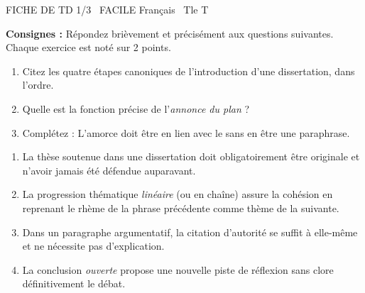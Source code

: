 \documentclass[11pt]{article}
\begin{document}
\begin{tcolorbox}[enhanced,colback=popink,colframe=popink,arc=10pt,boxrule=0pt,left=12pt,right=12pt,top=9pt,bottom=9pt]
{\color{white}\popxbold\small FICHE DE TD 1/3 \textbullet\ FACILE \hfill Français \textbullet\ Tle T\par}
\end{tcolorbox}
\vspace{4pt}
\textbf{Consignes :} Répondez brièvement et précisément aux questions suivantes. Chaque exercice est noté sur 2 points.

\begin{exercice}
\begin{enumerate}
    \item Citez les quatre étapes canoniques de l'introduction d'une dissertation, dans l'ordre.
    \item Quelle est la fonction précise de l'\textit{annonce du plan} ?
    \item Complétez : L'amorce doit être en lien avec le \underline{\hspace{3cm}} sans en être une paraphrase.
\end{enumerate}
\end{exercice}

\begin{exercice}
\begin{enumerate}
    \item La thèse soutenue dans une dissertation doit obligatoirement être originale et n'avoir jamais été défendue auparavant.
    \item La progression thématique \textit{linéaire} (ou en chaîne) assure la cohésion en reprenant le rhème de la phrase précédente comme thème de la suivante.
    \item Dans un paragraphe argumentatif, la citation d'autorité se suffit à elle-même et ne nécessite pas d'explication.
    \item La conclusion \textit{ouverte} propose une nouvelle piste de réflexion sans clore définitivement le débat.
\end{enumerate}
\end{exercice}
\end{document}
